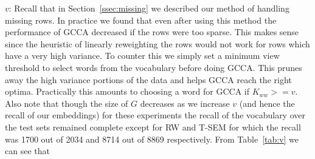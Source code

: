 \documentclass[11pt]{article}
\begin{document}
$v$: Recall that in Section~\ref{ssec:missing} we described our method
  of handling missing rows. In practice we found that even after using
  this method the performance of GCCA decreased if the rows were too
  sparse. This makes sense since the heuristic of linearly reweighting
  the rows would not work for rows which have a very high
  variance. To counter this we simply set a minimum view threshold
  to select words from the vocabulary before doing GCCA. This
  prunes away the high variance portions of the data and
  helps GCCA reach the right optima. Practically this amounts to
  choosing a word for GCCA if $K_{ww} >= v$. Also note that though the
  size of $G$ decreases as we increase $v$ (and hence the recall of
  our embeddings) for these experiments the recall of the vocabulary
  over the test sets remained complete except for RW and T-SEM for
  which the recall was 1700 out of 2034 and 8714 out of 8869
  respectively. From Table~\ref{tab:v} we can see that
\end{document}
